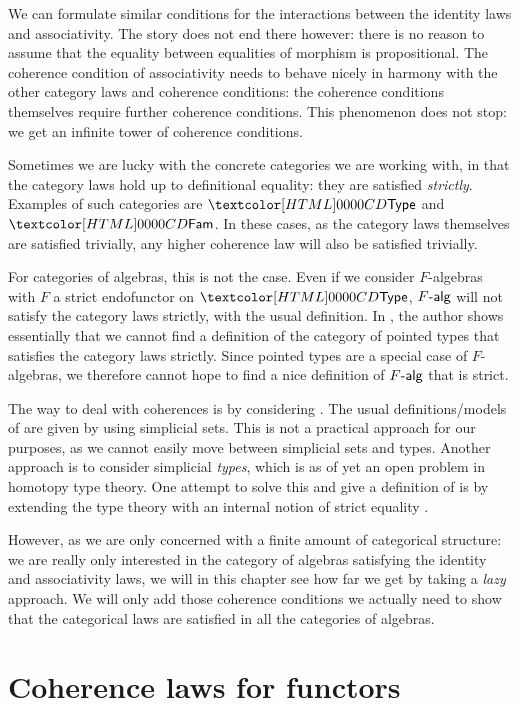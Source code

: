 We can formulate similar conditions for the interactions between the
identity laws and associativity. The story does not end there however:
there is no reason to assume that the equality between equalities of
morphism is propositional. The coherence condition of associativity
needs to behave nicely in harmony with the other category laws and
coherence conditions: the coherence conditions themselves require
further coherence conditions. This phenomenon does not stop: we get an
infinite tower of coherence conditions.

Sometimes we are lucky with the concrete categories we are working
with, in that the category laws hold up to definitional equality: they
are satisfied \emph{strictly}. Examples of such categories are $\Type$
and $\Fam$. In these cases, as the category laws themselves are
satisfied trivially, any higher coherence law will also be satisfied
trivially.

For categories of algebras, this is not the case. Even if we consider
$F$-algebras with $F$ a strict endofunctor on $\Type$, $\algcat{F}$
will not satisfy the category laws strictly, with the usual
definition. In \cite{Cranch2013}, the author shows essentially that we
cannot find a definition of the category of pointed types that
satisfies the category laws strictly. Since pointed types are a
special case of $F$-algebras, we therefore cannot hope to find a nice
definition of $\algcat{F}$ that is strict.

The way to deal with coherences is by considering \inftycats
\cite{Camarena2013}. The usual definitions/models of \inftycats are
given by using simplicial sets. This is not a practical approach for
our purposes, as we cannot easily move between simplicial sets and
types. Another approach is to consider simplicial \emph{types}, which
is as of yet an open problem in homotopy type theory. One attempt to
solve this and give a definition of \inftycats is by extending the
type theory with an internal notion of strict equality
\cite{Altenkirch2016,Altenkirch2016iii}.

However, as we are only concerned with a finite amount of categorical
structure: we are really only interested in the category of algebras
satisfying the identity and associativity laws, we will in this
chapter see how far we get by taking a \emph{lazy} approach. We will
only add those coherence conditions we actually need to show that the
categorical laws are satisfied in all the categories of algebras.

\section{Coherence laws for functors}

